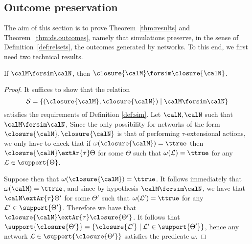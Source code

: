 \documentclass{LMCS}
\newcommand{\calL}{\ensuremath{{\mathcal{L}}}}
\begin{document}
\subsection{Outcome preservation}
\label{sec:technical.result.pres}

The aim of this section is to prove Theorem~\ref{thm:results} and 
Theorem~\ref{thm:ds.outcomes}, namely 
that simulations preserve, in the sense of Definition~\ref{def:relsets}, 
the outcomes  generated by networks.
To this end, we first need two technical results.

\begin{lem}
\label{lem:sim.closure}
If $\calM \forsim \calN$, then $\closure{\calM} \forsim \closure{\calN}$.
\end{lem}

\begin{proof}
It suffices to show that the relation 
\[
{\mathcal S} = \{ (\closure{\calM}, \closure{\calN}) \;|\; \calM \forsim \calN\}
\]
satisfies the requirements of Definition \ref{def:sim}.
Let $\calM, \calN$ such that $\calM \forsim \calN$, 
Since the only possibility for networks of the form 
$\closure{\calM}, \closure{\calN}$ 
is that of performing $\tau$-extensional actions, we only have 
to check that if $\omega(\closure{\calM}) = \ttrue$ then 
$\closure{\calN} \extAr{\tau} \Theta$ for some $\Theta$ 
such that $\omega(\calL) = \ttrue$ for any $\calL \in \support{\Theta}$. 

Suppose then that $\omega(\closure{\calM}) = \ttrue$. It follows 
immediately that $\omega(\calM) = \ttrue$, and since 
by hypothesis $\calM \forsim \calN$, we have that $\calN 
\extAr{\tau} \Theta'$ for some $\Theta'$ such that 
$\omega(\calL') = \ttrue$ for any $\calL' \in \support{\Theta'}$. 
Therefore we have that $\closure{\calN} \extAr{\tau} \closure{\Theta'}$. 
It follows that $\support{\closure{\Theta'}} = \{\closure{\calL'} \;|\; 
\calL' \in \support{\Theta'}\}$, hence any network $\calL \in 
\support{\closure{\Theta'}}$ satisfies the predicate $\omega$.
\end{proof} 
\end{document}
